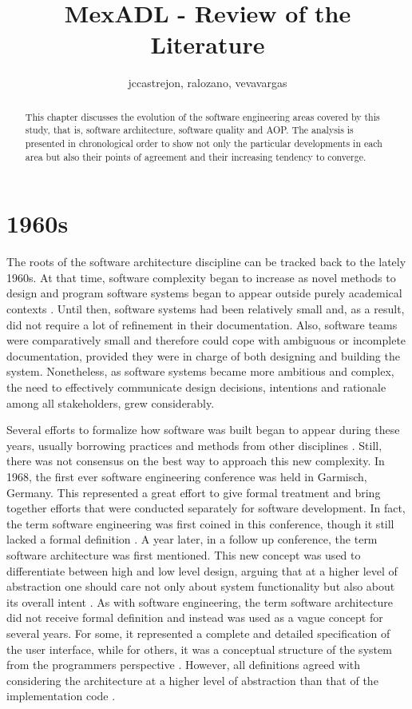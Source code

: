 \documentclass[10pt]{article}
\title{MexADL - Review of the Literature}
\author{jccastrejon, ralozano, vevavargas}
\begin{document}
\maketitle

\begin{abstract}
This chapter discusses the evolution of the software engineering areas covered by this study, that is, software architecture, software quality and AOP. The analysis is presented in chronological order to show not only the particular developments in each area but also their points of agreement and their increasing tendency to converge.
\end{abstract}


\section{1960s}

The roots of the software architecture discipline can be tracked back to the lately 1960s. At that time, software complexity began to increase as novel methods to design and program software systems began to appear outside purely academical contexts \cite{Barroca99}. Until then, software systems had been relatively small and, as a result, did not require a lot of refinement in their documentation. Also, software teams were comparatively small and therefore could cope with ambiguous or incomplete documentation, provided they were in charge of both designing and building the system. Nonetheless, as software systems became more ambitious and complex, the need to effectively communicate design decisions, intentions and rationale among all stakeholders, grew considerably.

Several efforts to formalize how software was built began to appear during these years, usually borrowing practices and methods from other disciplines \cite{Randell79}. Still, there was not consensus on the best way to approach this new complexity. In 1968, the first ever software engineering conference was held in Garmisch, Germany. This represented a great effort to give formal treatment and bring together efforts that were conducted separately for software development. In fact, the term software engineering was first coined in this conference, though it still lacked a formal definition \cite{Randell79}. A year later, in a follow up conference, the term software architecture was first mentioned. This new concept was used to differentiate between high and low level design, arguing that at a higher level of abstraction one should care not only about system functionality but also about its overall intent \cite{Randell70}. As with software engineering, the term software architecture did not receive formal definition and instead was used as a vague concept for several years. For some, it represented a complete and detailed specification of the user interface, while for others, it was a conceptual structure of the system from the programmers perspective \cite{Brooks75}. However, all definitions agreed with considering the architecture at a higher level of abstraction than that of the implementation code \cite{Barroca99}.
\end{document}
